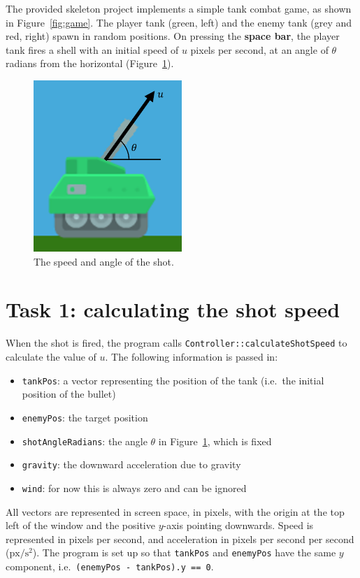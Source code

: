 \documentclass{../../../fal_assignment}
\begin{document}
The provided skeleton project implements a simple tank combat game, as shown in Figure~\ref{fig:game}.
The player tank (green, left) and the enemy tank (grey and red, right) spawn in random positions.
On pressing the \textbf{space bar}, the player tank fires a shell with an initial speed of $u$ pixels per second, at an angle of $\theta$ radians from the horizontal (Figure~\ref{fig:shotvector}).

\begin{figure}[ht]
	\begin{center}
		\includegraphics[width=0.5\textwidth]{shotvector}
	\end{center}
	\caption{The speed and angle of the shot.}
	\label{fig:shotvector}
\end{figure}

\section*{Task 1: calculating the shot speed}

When the shot is fired, the program calls \lstinline{Controller::calculateShotSpeed} to calculate the value of $u$.
The following information is passed in:
\begin{itemize}
	\item \lstinline{tankPos}: a vector representing the position of the tank (i.e.\ the initial position of the bullet)
	\item \lstinline{enemyPos}: the target position
	\item \lstinline{shotAngleRadians}: the angle $\theta$ in Figure~\ref{fig:shotvector}, which is fixed
	\item \lstinline{gravity}: the downward acceleration due to gravity
	\item \lstinline{wind}: for now this is always zero and can be ignored
\end{itemize}
All vectors are represented in screen space, in pixels, with the origin at the top left of the window and the positive $y$-axis pointing downwards.
Speed is represented in pixels per second, and acceleration in pixels per second per second ($\text{px} / \text{s}^2$).
The program is set up so that \lstinline{tankPos} and \lstinline{enemyPos} have the same $y$ component,
i.e.\ \lstinline{(enemyPos - tankPos).y == 0}.
\end{document}

